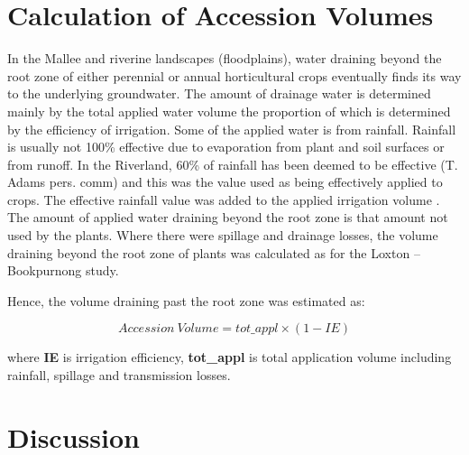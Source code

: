 \documentclass[a4paper, titlepage, 12pt]{article}\usepackage[]{graphicx}\usepackage[]{color}
\makeatletter
\newenvironment{kframe}{%
 \def\at@end@of@kframe{}%
 \ifinner\ifhmode%
  \def\at@end@of@kframe{\end{minipage}}%
  \begin{minipage}{\columnwidth}%
 \fi\fi%
 \def\FrameCommand##1{\hskip\@totalleftmargin \hskip-\fboxsep
 \colorbox{shadecolor}{##1}\hskip-\fboxsep
     \hskip-\linewidth \hskip-\@totalleftmargin \hskip\columnwidth}%
 \MakeFramed {\advance\hsize-\width
   \@totalleftmargin\z@ \linewidth\hsize
   \@setminipage}}%
 {\par\unskip\endMakeFramed%
 \at@end@of@kframe}
\newenvironment{knitrout}{}{} %
\makeatother
\begin{document}
\begin{sffamily}
\section{Calculation of Accession Volumes}
In the Mallee and riverine landscapes (floodplains), water draining beyond the root zone of either perennial or annual horticultural crops eventually finds its way to the underlying groundwater. The amount of drainage water is determined mainly by the total applied water volume the proportion of which is determined by the efficiency of irrigation. Some of the applied water is from rainfall.  Rainfall is usually not 100\% effective due to evaporation from plant and soil surfaces \citep{Dastane} or from runoff.  In the Riverland, 60\% of rainfall has been deemed to be effective (T. Adams pers. comm) and this was the value used as being effectively applied to crops. The effective rainfall value was added to the applied irrigation volume \citep{Meissner2011b}.  The amount of applied water draining beyond the root zone is that amount not used by the plants.  Where there were spillage and drainage losses, the volume draining beyond the root zone of plants was calculated as for the Loxton -- Bookpurnong study\citep{Meissner2011a}.

Hence, the volume draining past the root zone was estimated as:

\begin{equation}  \label{eqn04} 
  Accession\ Volume = tot\_appl \times (1-IE)
\end{equation}

\noindent where \textbf{IE} is irrigation efficiency, \textbf{tot\_appl} is total application volume including rainfall, spillage and transmission losses. 


\section{Discussion}
\begin{knitrout}
\color{fgcolor}\begin{kframe}


{\ttfamily\noindent\bfseries{}}

{\ttfamily\noindent\bfseries\color{errorcolor}{\#\# Error in ifelse(is.nan(cobby[, j]), NA, cobby[, j]): object 'cobby' not found}}


\end{kframe}
\end{knitrout}
\end{sffamily}
\end{document}

